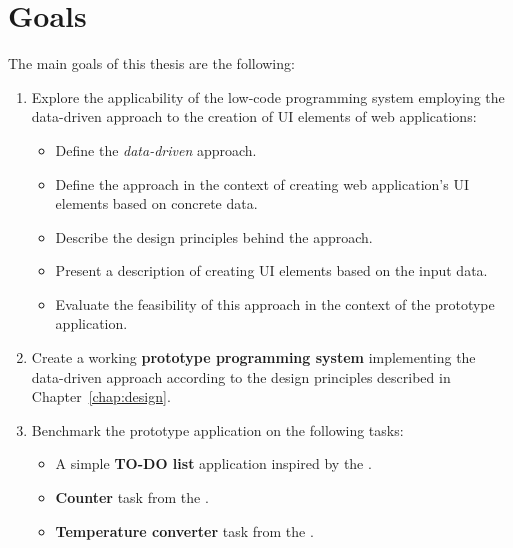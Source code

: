 \section*{Goals}
\nopagebreak[4]
The main goals of this thesis are the following:
\nopagebreak[4]
\begin{enumerate}
	\item Explore the applicability of the low-code programming system employing the data-driven approach to the creation of UI elements of web applications:
	      \begin{itemize}
		      \item Define the \emph{data-driven} approach.
		      \item Define the approach in the context of creating web application's UI elements based on concrete data.
		      \item Describe the design principles behind the approach.
		      \item Present a description of creating UI elements based on the input data.
		      \item Evaluate the feasibility of this approach in the context of the prototype application.
	      \end{itemize}
	\item Create a working \textbf{prototype programming system} implementing the data-driven approach according to the design principles described in Chapter~\ref{chap:design}.
	\item Benchmark the prototype application on the following tasks:
	      \begin{itemize}
		      \item A simple \textbf{TO-DO list} application inspired by the \citet{TodoMVC}.
		      \item \textbf{Counter} task from the \citet{7GUIs-web}.
		      \item \textbf{Temperature converter} task from the \citet{7GUIs-web}.
	      \end{itemize}
\end{enumerate}
\medskip
